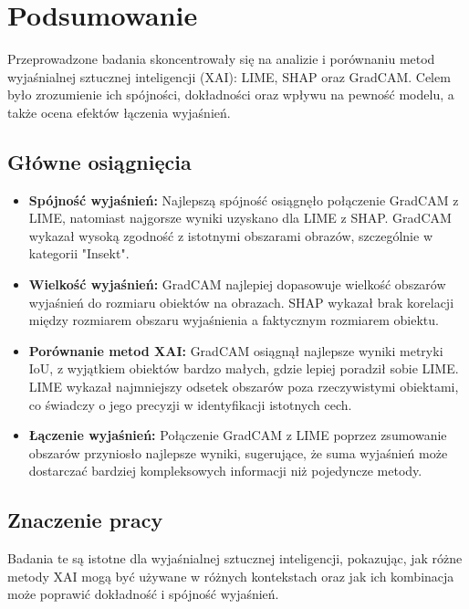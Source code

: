 
\chapter*{Podsumowanie}


Przeprowadzone badania skoncentrowały się na analizie i porównaniu metod wyjaśnialnej sztucznej inteligencji (XAI): LIME, SHAP oraz GradCAM. Celem było zrozumienie ich spójności, dokładności oraz wpływu na pewność modelu, a także ocena efektów łączenia wyjaśnień.

\section*{Główne osiągnięcia}

\begin{itemize}
    \item \textbf{Spójność wyjaśnień:} Najlepszą spójność osiągnęło połączenie GradCAM z LIME, natomiast najgorsze wyniki uzyskano dla LIME z SHAP. GradCAM wykazał wysoką zgodność z istotnymi obszarami obrazów, szczególnie w kategorii "Insekt".
    
    \item \textbf{Wielkość wyjaśnień:} GradCAM najlepiej dopasowuje wielkość obszarów wyjaśnień do rozmiaru obiektów na obrazach. SHAP wykazał brak korelacji między rozmiarem obszaru wyjaśnienia a faktycznym rozmiarem obiektu.
    
    \item \textbf{Porównanie metod XAI:} GradCAM osiągnął najlepsze wyniki metryki IoU, z wyjątkiem obiektów bardzo małych, gdzie lepiej poradził sobie LIME. LIME wykazał najmniejszy odsetek obszarów poza rzeczywistymi obiektami, co świadczy o jego precyzji w identyfikacji istotnych cech.
    
    \item \textbf{Łączenie wyjaśnień:} Połączenie GradCAM z LIME poprzez zsumowanie obszarów przyniosło najlepsze wyniki, sugerujące, że suma wyjaśnień może dostarczać bardziej kompleksowych informacji niż pojedyncze metody.
\end{itemize}

\section*{Znaczenie pracy}

Badania te są istotne dla wyjaśnialnej sztucznej inteligencji, pokazując, jak różne metody XAI mogą być używane w różnych kontekstach oraz jak ich kombinacja może poprawić dokładność i spójność wyjaśnień.

